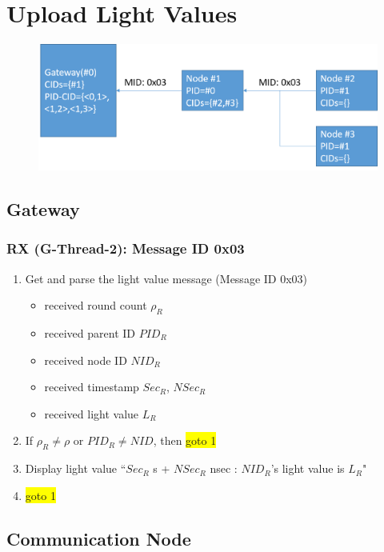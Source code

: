 \documentclass[letterpaper,9pt]{article}
\begin{document}
\newpage
\section{Upload Light Values}

\begin{figure}[!h]
	\centering
	\includegraphics[width=12cm]{./img/lightvalue.png}
\end{figure}

\subsection{Gateway}

\subsubsection{RX (G-Thread-2): Message ID 0x03}

\begin{enumerate}
	\item Get and parse the light value message (Message ID 0x03)
	\begin{itemize}
		\item received round count $\rho_R$
		\item received parent ID $PID_R$
		\item received node ID $NID_R$
		\item received timestamp $Sec_R$, $NSec_R$
		\item received light value $L_R$
	\end{itemize}
		\item If $\rho_R \neq \rho$ or $PID_R \neq NID$, then \colorbox{yellow}{goto 1}
		\item Display light value ``$Sec_R$ s + $NSec_R$ nsec : $NID_R$'s light value is $L_R$"
	\item \colorbox{yellow}{goto 1}
\end{enumerate}

\subsection{Communication Node}
\end{document}
